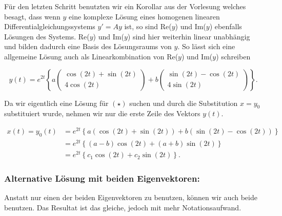\vspace{0.5\baselineskip}

Für den letzten Schritt benutzten wir ein Korollar aus der Vorlesung welches besagt, dass wenn \( y \) eine komplexe Lösung eines homogenen linearen Differentialgleichungssystems \( y'=Ay \) ist, so sind Re(\(y\)) und Im(\(y\)) ebenfalls Lösungen des Systems. Re(\(y\)) und Im(\(y\)) sind hier weiterhin linear unabhängig und bilden dadurch eine Basis des Lösungsraums von \( y \). So lässt sich eine allgemeine Lösung auch als Linearkombination von Re(\(y\)) und Im(\(y\)) schreiben

\begin{equation*}
    y(t) = e^{2t} \left\{ a \begin{pmatrix}
        \cos(2t) + \sin(2t) \\
        4 \cos(2t)
    \end{pmatrix} + b \begin{pmatrix}
        \sin(2t) - \cos(2t) \\
        4 \sin(2t)
    \end{pmatrix} \right\}.
\end{equation*}

\vspace{0.5\baselineskip}

Da wir eigentlich eine Lösung für \( (\star) \) suchen und durch die Substitution \( x = y_0 \) substituiert wurde, nehmen wir nur die erste Zeile des Vektors \( y(t) \). 

\begin{equation*}
    \begin{aligned}
    x(t) = y_0(t) &= e^{2t} \left\{ a ( \cos(2t) + \sin(2t) ) + b ( \sin(2t) - \cos(2t) ) \right\} \\[0.5em]
    &= e^{2t} \left\{ (a-b) \cos(2t) + (a+b) \sin(2t) \right\} \\[0.5em]
    &= e^{2t} \left\{ c_1 \cos(2t) + c_2 \sin(2t) \right\}.
    \end{aligned}
\end{equation*}

\newpage

\subsubsection{Alternative Lösung mit beiden Eigenvektoren:}

Anstatt nur einen der beiden Eigenvektoren zu benutzen, können wir auch beide benutzen. Das Resultat ist das gleiche, jedoch mit mehr Notationsaufwand.

